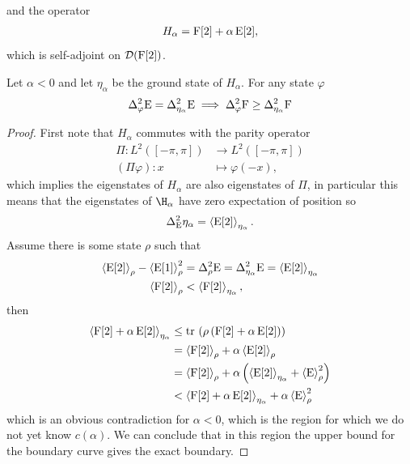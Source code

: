 and the operator
\begin{align}
  H_\alpha = \operatorname{F}[2] + \alpha\operatorname{E}[2],
\end{align}
which is self-adjoint on $\mathcal{D}(\operatorname{F}[2])$.
\begin{lem}
  Let $\alpha < 0$ and let $\eta_\alpha$ be the ground state of $H_\alpha$. For any state $\varphi$
  \begin{align}
    \var[\varphi]{\ope} = \var[\eta_\alpha]{\ope} \implies \var[\varphi]{\opf} \geq \var[\eta_\alpha]{\opf}
  \end{align}
\end{lem}
\begin{proof}
First note that $H_\alpha$ commutes with the parity operator 
\begin{align}
  \Pi: L^2([-\pi,\pi]) &\to L^2([-\pi,\pi])\\
  (\Pi \varphi):x &\mapsto \varphi(-x),
\end{align}
which implies the eigenstates of $H_\alpha$ are also eigenstates of $\Pi$, in particular this means that the eigenstates of $\H_\alpha$ have zero expectation of position so
\begin{align}
  \var[\ope]{\eta_\alpha} = \expe{\ope[2]}{\eta_\alpha}.
\end{align}
Assume there is some state $\rho$ such that
\begin{align}
	\expe{\ope[2]}{\rho} - \expe{\ope[1]}{\rho}^2 &= \var[\rho]{\ope} = \var[\eta_\alpha]{\ope} = \expe{\ope[2]}{\eta_\alpha}\\
	\expe{\opf[2]}{\rho} &< \expe{\opf[2]}{\eta_\alpha},
\end{align}
then
\begin{align}
	\expe{\opf[2] +\alpha\ope[2]}{\eta_\alpha} &\leq \tr{\rho\left(\opf[2] +\alpha\ope[2]\right)}\\
	&= \expe{\opf[2]}{\rho} + \alpha\expe{\ope[2]}{\rho}\\
	&= \expe{\opf[2]}{\rho} + \alpha\left(\expe{\ope[2]}{\eta_\alpha} + \expe{\ope}{\rho}^2\right)\\
	&< \expe{\opf[2] + \alpha\ope[2]}{\eta_\alpha} + \alpha\expe{\ope}{\rho}^2
\end{align}
which is an obvious contradiction for $\alpha < 0$, which is the region for which we do not yet know $c(\alpha)$. We can conclude that in this region the upper bound for the boundary curve gives the exact boundary. 
\end{proof}

